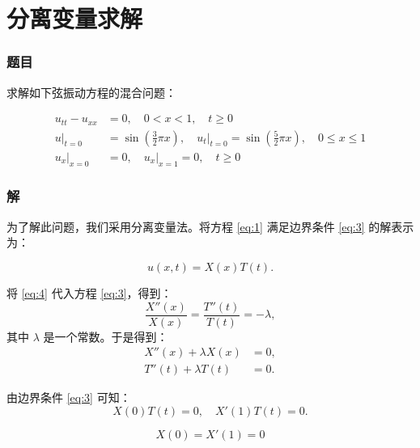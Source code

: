 \section{分离变量求解}



\subsubsection*{题目}
求解如下弦振动方程的混合问题：

\setcounter{equation}{0}

\begin{align}
    u_{tt} - u_{xx} &= 0, \quad 0 < x < 1, \quad t \geq 0 \label{eq:1} \\
    u|_{t=0} &= \sin\left(\frac{3}{2} \pi x\right), \quad 
    u_t|_{t=0} = \sin\left(\frac{5}{2} \pi x\right), \quad 0 \leq x \leq 1 \label{eq:2} \\
    u_x|_{x=0} &= 0, \quad u_x|_{x=1} = 0, \quad t \geq 0 \label{eq:3}
\end{align}

\subsubsection*{解}

为了解此问题，我们采用分离变量法。将方程 \eqref{eq:1} 满足边界条件 \eqref{eq:3} 的解表示为：

\begin{equation}
    u(x, t) = X(x) T(t). \label{eq:4}
\end{equation}

将 \eqref{eq:4} 代入方程 \eqref{eq:3}，得到：
\begin{equation}
    \frac{X''(x)}{X(x)} = \frac{T''(t)}{T(t)} = -\lambda, \nonumber
\end{equation}
其中 $\lambda$ 是一个常数。于是得到：
\begin{align}
    X''(x) + \lambda X(x) &= 0, \label{eq:5} \\
    T''(t) + \lambda T(t) &= 0. \label{eq:6}
\end{align}

由边界条件 \eqref{eq:3} 可知：
\begin{equation}
    X(0) T(t) = 0, \quad X'(1) T(t) = 0. \nonumber
\end{equation}

\begin{equation}
X(0) = X'(1) = 0 \label{eq:7}
\end{equation}

